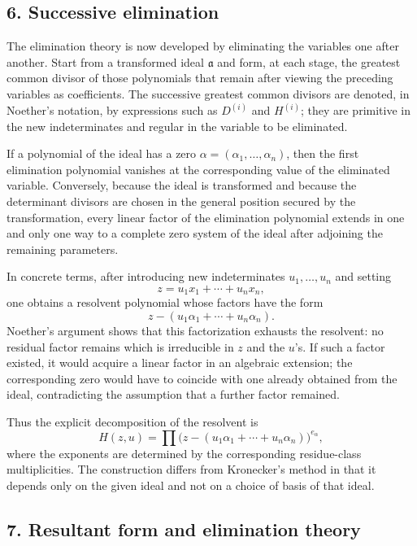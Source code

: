 \documentclass[12pt]{article}
\begin{document}
\subsection{6. Successive elimination}

The elimination theory is now developed by eliminating the variables one after another. Start from a transformed ideal $\mathfrak a$ and form, at each stage, the greatest common divisor of those polynomials that remain after viewing the preceding variables as coefficients. The successive greatest common divisors are denoted, in Noether's notation, by expressions such as $D^{(i)}$ and $H^{(i)}$; they are primitive in the new indeterminates and regular in the variable to be eliminated.

If a polynomial of the ideal has a zero $\alpha=(\alpha_1,\ldots,\alpha_n)$, then the first elimination polynomial vanishes at the corresponding value of the eliminated variable. Conversely, because the ideal is transformed and because the determinant divisors are chosen in the general position secured by the transformation, every linear factor of the elimination polynomial extends in one and only one way to a complete zero system of the ideal after adjoining the remaining parameters.

In concrete terms, after introducing new indeterminates $u_1,\ldots,u_n$ and setting
\[
  z=u_1x_1+\cdots+u_nx_n,
\]
one obtains a resolvent polynomial whose factors have the form
\[
  z-(u_1\alpha_1+
\cdots+u_n\alpha_n).
\]
Noether's argument shows that this factorization exhausts the resolvent: no residual factor remains which is irreducible in $z$ and the $u$'s. If such a factor existed, it would acquire a linear factor in an algebraic extension; the corresponding zero would have to coincide with one already obtained from the ideal, contradicting the assumption that a further factor remained.

Thus the explicit decomposition of the resolvent is
\begin{equation}
  H(z,u)=\prod\bigl(z-(u_1\alpha_1+
\cdots+u_n\alpha_n)\bigr)^{e_\alpha},        \tag{36}
\end{equation}
where the exponents are determined by the corresponding residue-class multiplicities. The construction differs from Kronecker's method in that it depends only on the given ideal and not on a choice of basis of that ideal.

\subsection{7. Resultant form and elimination theory}
\end{document}
